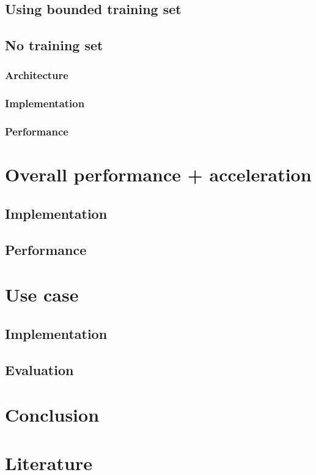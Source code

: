 \documentclass[
	ngerman,
	ruledheaders=section,%
	class=report,%
	thesis={type=bachelor},%
	accentcolor=9c,%
	custommargins=true,%
	marginpar=false,%
	parskip=half-,%
	fontsize=11pt,%
	logofile=tud_logo.png, %
]{tudapub}
\begin{document}
\subsection{Using bounded training set}
\pagebreak
\subsection{No training set}
\pagebreak
\subsubsection{Architecture}
\pagebreak
\subsubsection{Implementation}
\pagebreak
\subsubsection{Performance}
\pagebreak

\section{Overall performance + acceleration}
\subsection{Implementation}
\pagebreak
\subsection{Performance}
\pagebreak

\section{Use case}
\subsection{Implementation}
\pagebreak
\subsection{Evaluation}
\pagebreak

\section{Conclusion}
\pagebreak

\section{Literature}

\printbibliography
\end{document}
